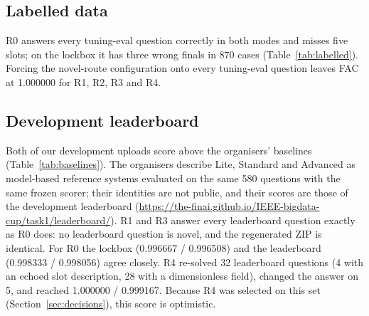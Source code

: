 \documentclass[conference]{IEEEtran}
\begin{document}
\subsection{Labelled data}
R0 answers every tuning-eval question correctly in both modes and misses five slots; on the lockbox it has three wrong finals in 870 cases (Table~\ref{tab:labelled}). Forcing the novel-route configuration onto every tuning-eval question leaves FAC at 1.000000 for R1, R2, R3 and R4.

\subsection{Development leaderboard}
Both of our development uploads score above the organisers' baselines (Table~\ref{tab:baselines}). The organisers describe Lite, Standard and Advanced as model-based reference systems evaluated on the same 580 questions with the same frozen scorer; their identities are not public, and their scores are those of the development leaderboard (\url{https://the-finai.github.io/IEEE-bigdata-cup/task1/leaderboard/}). R1 and R3 answer every leaderboard question exactly as R0 does: no leaderboard question is novel, and the regenerated ZIP is identical. For R0 the lockbox (0.996667 / 0.996508) and the leaderboard (0.998333 / 0.998056) agree closely. R4 re-solved 32 leaderboard questions (4 with an echoed slot description, 28 with a dimensionless field), changed the answer on 5, and reached 1.000000 / 0.999167. Because R4 was selected on this set (Section~\ref{sec:decisions}), this score is optimistic.
\end{document}
